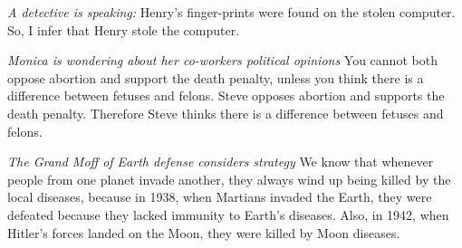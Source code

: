 \begin{exercises}

\item \textit{A detective is speaking: }Henry's finger-prints were found on the stolen computer. So, I infer that Henry stole the computer.  



\item \textit{Monica is wondering about her co-workers political opinions} You cannot both oppose abortion and support the death penalty, unless you think there is a difference between fetuses and felons. Steve opposes abortion and supports the death penalty. Therefore Steve thinks there is a difference between fetuses and felons. 



\item \textit{The Grand Moff of Earth defense considers strategy} We know that whenever people from one planet invade another, they always wind up being killed by the local diseases, because in 1938, when Martians invaded the Earth, they were defeated because they lacked immunity to Earth's diseases. Also, in 1942, when Hitler's forces landed on the Moon, they were killed by Moon diseases.




\end{exercises}

